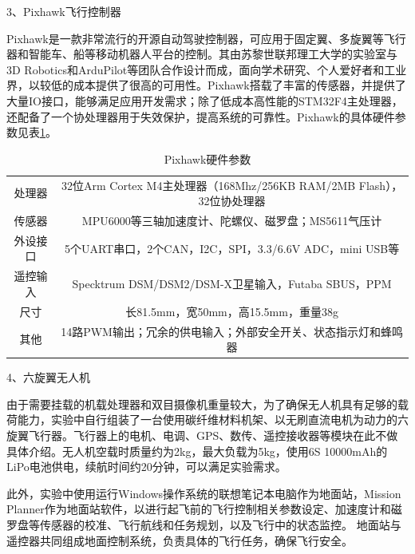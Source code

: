 3、Pixhawk飞行控制器

Pixhawk是一款非常流行的开源自动驾驶控制器，可应用于固定翼、多旋翼等飞行器和智能车、船等移动机器人平台的控制。其由苏黎世联邦理工大学的实验室与3D Robotics和ArduPilot等团队合作设计而成，面向学术研究、个人爱好者和工业界，以较低的成本提供了很高的可用性。Pixhawk搭载了丰富的传感器，并提供了大量IO接口，能够满足应用开发需求；除了低成本高性能的STM32F4主处理器，还配备了一个协处理器用于失效保护，提高系统的可靠性。Pixhawk的具体硬件参数见表\ref{tab:5_Pixhawk}。
\begin{table}[htb] %
	\centering
	\caption{Pixhawk硬件参数}
	\label{tab:5_Pixhawk}
	\begin{small}
		\begin{tabular*}{\textwidth}{@{\extracolsep{\fill}}cc} \toprule[2pt]
			处理器 & 32位Arm Cortex M4主处理器（168Mhz/256KB RAM/2MB Flash），32位协处理器 \\
			传感器 & MPU6000等三轴加速度计、陀螺仪、磁罗盘；MS5611气压计 \\
			外设接口 & 5个UART串口，2个CAN，I2C，SPI，3.3/6.6V ADC，mini USB等 \\
			遥控输入 & Specktrum DSM/DSM2/DSM-X卫星输入，Futaba SBUS，PPM \\
			尺寸 & 长81.5mm，宽50mm，高15.5mm，重量38g \\
			其他 & 14路PWM输出；冗余的供电输入；外部安全开关、状态指示灯和蜂鸣器
			\\ \bottomrule[2pt]
		\end{tabular*}
	\end{small}
\end{table}


4、六旋翼无人机

由于需要挂载的机载处理器和双目摄像机重量较大，为了确保无人机具有足够的载荷能力，实验中自行组装了一台使用碳纤维材料机架、以无刷直流电机为动力的六旋翼飞行器。飞行器上的电机、电调、GPS、数传、遥控接收器等模块在此不做具体介绍。无人机空载时质量约为2kg，最大负载为5kg，使用6S 10000mAh的LiPo电池供电，续航时间约20分钟，可以满足实验需求。

此外，实验中使用运行Windows操作系统的联想笔记本电脑作为地面站，Mission Planner作为地面站软件，以进行起飞前的飞行控制相关参数设定、加速度计和磁罗盘等传感器的校准、飞行航线和任务规划，以及飞行中的状态监控。
地面站与遥控器共同组成地面控制系统，负责具体的飞行任务，确保飞行安全。

